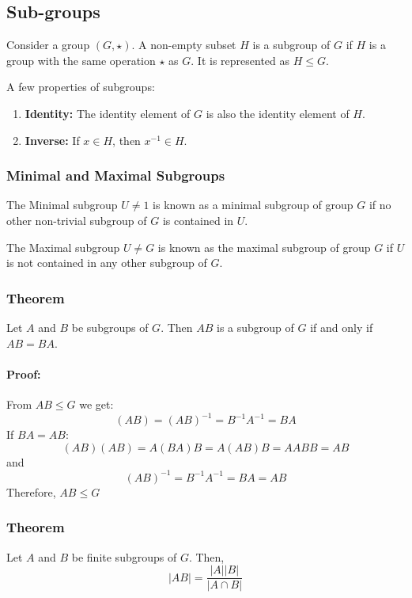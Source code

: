 \documentclass[12pt, oneside]{book}
\begin{document}
\subsection{Sub-groups}
Consider a group \( \left(G, \star \right) \).
A non-empty subset \(H\) is a subgroup of \(G\) if \(H\) is a group with the same operation \(\star\) as \(G\).
It is represented as \(H \leq G\).

A few properties of subgroups:
\begin{enumerate}
	\item \textbf{Identity:} The identity element of \(G\) is also the identity element of \(H\).
	\item \textbf{Inverse:} If \(x \in H\), then \(x^{-1} \in H\).
\end{enumerate}

\subsubsection{Minimal and Maximal Subgroups}
The Minimal subgroup \(U \neq 1\) is known as a minimal subgroup of group \(G\) if no other non-trivial subgroup of \(G\) is contained in \(U\).

The Maximal subgroup \(U \neq G\) is known as the maximal subgroup of group \(G\) if \(U\) is not contained in any other subgroup of \(G\).

\subsubsection{Theorem}
Let \(A\) and \(B\) be subgroups of \(G\).
Then \(AB\) is a subgroup of \(G\) if and only if \(AB=BA\).

\paragraph{Proof:} From \( AB \leq G \) we get:
\[ \left(AB \right) = \left(AB\right)^{-1} = B^{-1} A^{-1} = BA \]
If \(BA = AB\):
\[\left(AB\right) \left(AB\right) = A\left(BA\right) B = A\left(AB\right)B = AABB = AB \]
and
\[ \left(AB\right)^{-1} = B^{-1} A^{-1} = BA = AB\]
Therefore, \(AB \leq G\)

\subsubsection{Theorem}
Let \(A\) and \(B\) be finite subgroups of \(G\).
Then, \[ \left| AB \right| = \frac{ \left| A \right| \left| B \right|}{\left| A \cap B \right|} \]
\end{document}
